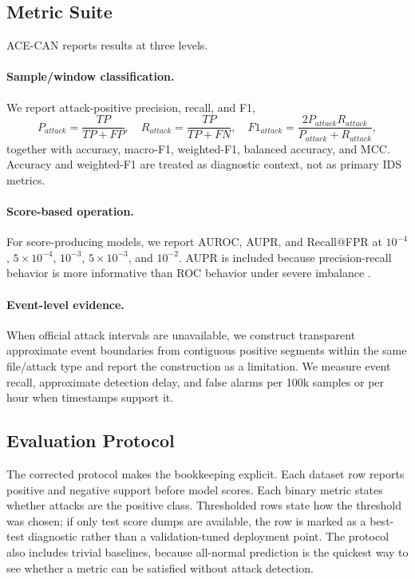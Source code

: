 \documentclass[runningheads]{llncs}%
\newcommand{\framework}{ACE-CAN}
\begin{document}
\subsection{Metric Suite}
\framework{} reports results at three levels.
\paragraph{Sample/window classification.}  We report attack-positive precision, recall, and F1,
\begin{equation}
    P_{attack}=\frac{TP}{TP+FP}, \quad R_{attack}=\frac{TP}{TP+FN}, \quad
    F1_{attack}=\frac{2P_{attack}R_{attack}}{P_{attack}+R_{attack}},
\end{equation}
together with accuracy, macro-F1, weighted-F1, balanced accuracy, and MCC.  Accuracy and weighted-F1 are treated as diagnostic context, not as primary IDS metrics.
\paragraph{Score-based operation.}  For score-producing models, we report AUROC, AUPR, and Recall@FPR at $10^{-4}$, $5\times10^{-4}$, $10^{-3}$, $5\times10^{-3}$, and $10^{-2}$.  AUPR is included because precision-recall behavior is more informative than ROC behavior under severe imbalance \cite{davis2006pr,saito2015pr}.
\paragraph{Event-level evidence.}  When official attack intervals are unavailable, we construct transparent approximate event boundaries from contiguous positive segments within the same file/attack type and report the construction as a limitation.  We measure event recall, approximate detection delay, and false alarms per 100k samples or per hour when timestamps support it.

\subsection{Evaluation Protocol}
The corrected protocol makes the bookkeeping explicit.  Each dataset row reports positive and negative support before model scores.  Each binary metric states whether attacks are the positive class.  Thresholded rows state how the threshold was chosen; if only test score dumps are available, the row is marked as a best-test diagnostic rather than a validation-tuned deployment point.  The protocol also includes trivial baselines, because all-normal prediction is the quickest way to see whether a metric can be satisfied without attack detection.
\end{document}
